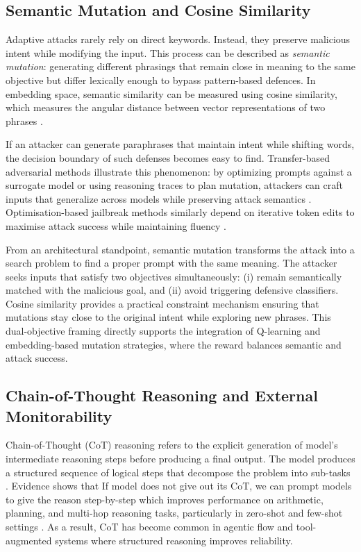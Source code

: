 \documentclass[conference]{IEEEtran}
\begin{document}
\subsection{Semantic Mutation and Cosine Similarity}

Adaptive attacks rarely rely on direct keywords. Instead, they preserve malicious intent while modifying the input. This process can be described as \emph{semantic mutation}: generating different phrasings that remain close in meaning to the same objective but differ lexically enough to bypass pattern-based defences. In embedding space, semantic similarity can be measured using cosine similarity, which measures the angular distance between vector representations of two phrases \cite{b14}.

If an attacker can generate paraphrases that maintain intent while shifting words, the decision boundary of such defenses becomes easy to find. Transfer-based adversarial methods illustrate this phenomenon: by optimizing prompts against a surrogate model or using reasoning traces to plan mutation, attackers can craft inputs that generalize across models while preserving attack semantics \cite{b11}. Optimisation-based jailbreak methods similarly depend on iterative token edits to maximise attack success while maintaining fluency \cite{b10}.

From an architectural standpoint, semantic mutation transforms the attack into a search problem to find a proper prompt with the same meaning. The attacker seeks inputs that satisfy two objectives simultaneously: (i) remain semantically matched with the malicious goal, and (ii) avoid triggering defensive classifiers. Cosine similarity provides a practical constraint mechanism ensuring that mutations stay close to the original intent while exploring new phrases. This dual-objective framing directly supports the integration of Q-learning and embedding-based mutation strategies, where the reward balances semantic and attack success.

\subsection{Chain-of-Thought Reasoning and External Monitorability}

Chain-of-Thought (CoT) reasoning refers to the explicit generation of model’s intermediate reasoning steps before producing a final output. The model produces a structured sequence of logical steps that decompose the problem into sub-tasks \cite{b24,b25}. Evidence shows that If model does not give out its CoT, we can prompt models to give the reason step-by-step which improves performance on arithmetic, planning, and multi-hop reasoning tasks, particularly in zero-shot and few-shot settings \cite{b25}. As a result, CoT has become common in agentic flow and tool-augmented systems where structured reasoning improves reliability.
\end{document}
